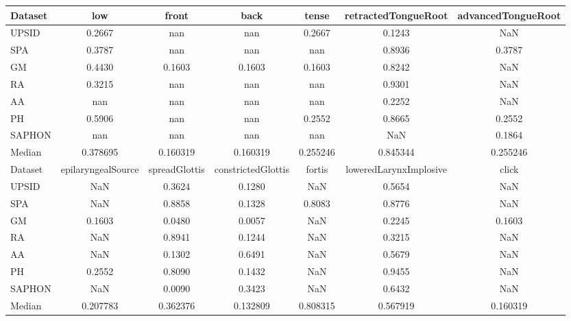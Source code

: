 \documentclass[a4paper,12pt]{article}
\begin{document}
\begin{minipage}{\textwidth}
\begin{adjustbox}{max width=\textwidth}
\begin{tabular}{ | l | c | c | c | c | c | c |}
    \bottomrule
    \toprule
    Dataset &       low &     front &      back &     tense & retractedTongueRoot & advancedTongueRoot \\
    \midrule
    UPSID &    0.2667 &       nan &       nan &    0.2667 &              0.1243 &                NaN \\
    SPA &    0.3787 &       nan &       nan &       nan &              0.8936 &             0.3787 \\
    GM &    0.4430 &    0.1603 &    0.1603 &    0.1603 &              0.8242 &                NaN \\
    RA &    0.3215 &       nan &       nan &       nan &              0.9301 &                NaN \\
    AA &       nan &       nan &       nan &       nan &              0.2252 &                NaN \\
    PH &    0.5906 &       nan &       nan &    0.2552 &              0.8665 &             0.2552 \\
    SAPHON &       nan &       nan &       nan &       nan &                 NaN &             0.1864 \\
    Median &  0.378695 &  0.160319 &  0.160319 &  0.255246 &            0.845344 &           0.255246 \\
    \bottomrule
    \toprule
    Dataset & epilaryngealSource & spreadGlottis & constrictedGlottis &    fortis & loweredLarynxImplosive &     click \\
    \midrule
    UPSID &                NaN &        0.3624 &             0.1280 &       NaN &                 0.5654 &       NaN \\
    SPA &                NaN &        0.8858 &             0.1328 &    0.8083 &                 0.8776 &       NaN \\
    GM &             0.1603 &        0.0480 &             0.0057 &       NaN &                 0.2245 &    0.1603 \\
    RA &                NaN &        0.8941 &             0.1244 &       NaN &                 0.3215 &       NaN \\
    AA &                NaN &        0.1302 &             0.6491 &       NaN &                 0.5679 &       NaN \\
    PH &             0.2552 &        0.8090 &             0.1432 &       NaN &                 0.9455 &       NaN \\
    SAPHON &                NaN &        0.0090 &             0.3423 &       NaN &                 0.6432 &       NaN \\
    Median &           0.207783 &      0.362376 &           0.132809 &  0.808315 &               0.567919 &  0.160319 \\
    \bottomrule
\end{tabular}
\end{adjustbox}
\end{minipage}
\bigskip
\end{document}
